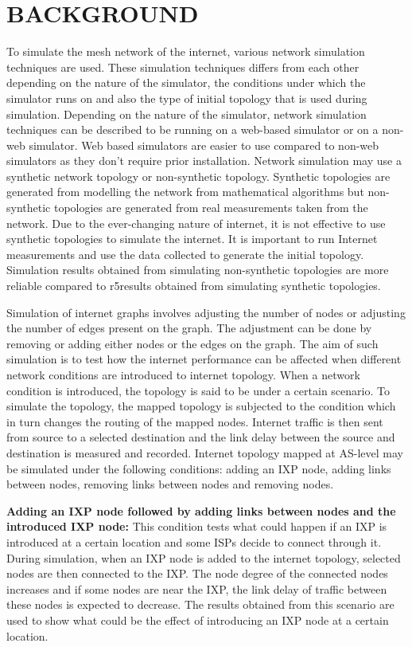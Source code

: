
\section{BACKGROUND}
 To simulate the mesh network of the internet, various network simulation techniques are used. These simulation techniques differs from each other depending on the nature of the simulator, the conditions under which the simulator runs on and also the type of initial topology that is used during simulation. Depending on the nature of the simulator, network simulation techniques can be described to be running on a web-based simulator or on a non-web simulator. Web based simulators are easier to use compared to non-web simulators as they don't require prior installation. Network simulation may use a synthetic network topology or non-synthetic topology. Synthetic topologies are generated from modelling the network from mathematical algorithms but non-synthetic topologies are generated from real measurements taken from the network. Due to the ever-changing nature of internet, it is not effective to use synthetic topologies to simulate the internet. It is important to run Internet measurements and use the data collected to generate the initial topology. Simulation results obtained from simulating non-synthetic topologies are more reliable compared to r5results obtained from simulating synthetic topologies.  
 
 Simulation of internet graphs involves adjusting the number of nodes or adjusting the number of edges \cite{Internetgraph} present on the graph. The adjustment can be done by removing or adding either nodes or the edges on the graph. The aim of such simulation is to test how the internet performance can be affected when different network conditions are introduced to internet topology. When a network condition is introduced, the topology is said to be under a certain scenario. To simulate the topology, the mapped topology is subjected to the condition which in turn changes the routing of the mapped nodes. Internet traffic is then sent from source to a selected destination and the link delay between the source and destination is measured and recorded. Internet topology mapped at AS-level may be simulated under the following conditions: adding an IXP node, adding links between nodes, removing links between nodes and removing nodes.  

\textbf{Adding an IXP node followed by adding links between nodes and the introduced IXP node:} This condition tests what could happen if an IXP is introduced at a certain location and some ISPs decide to connect through it.  During simulation, when an IXP node is added to the internet topology, selected nodes are then connected to the IXP. The node degree of the connected nodes increases and if some nodes are near the IXP, the link delay of traffic between these nodes is expected to decrease. The results obtained from this scenario are used to show what could be the effect of introducing an IXP node at a certain location. 

